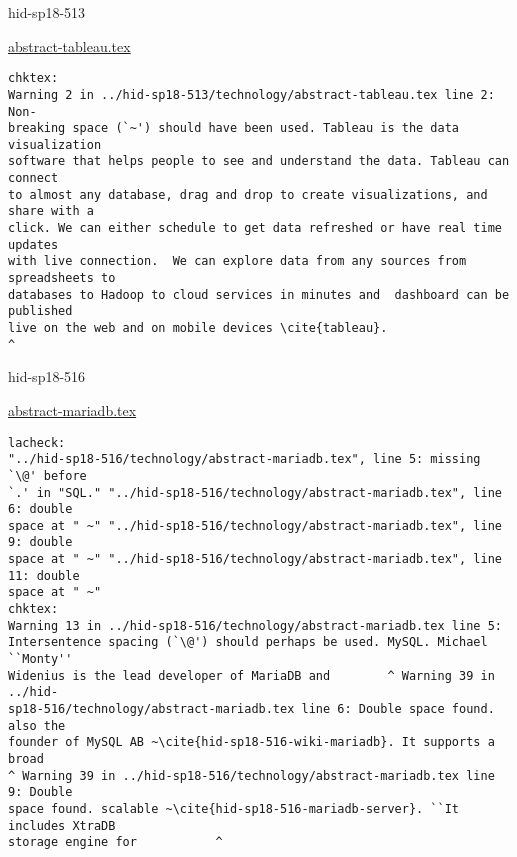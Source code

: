\begin{IU}

hid-sp18-513

\href{https://github.com/cloudmesh-community/hid-sp18-513/blob/master//technology/abstract-tableau.tex}{abstract-tableau.tex}

\begin{tiny}
\begin{verbatim}
chktex:
Warning 2 in ../hid-sp18-513/technology/abstract-tableau.tex line 2: Non-
breaking space (`~') should have been used. Tableau is the data visualization
software that helps people to see and understand the data. Tableau can connect
to almost any database, drag and drop to create visualizations, and share with a
click. We can either schedule to get data refreshed or have real time updates
with live connection.  We can explore data from any sources from spreadsheets to
databases to Hadoop to cloud services in minutes and  dashboard can be published
live on the web and on mobile devices \cite{tableau}.
^
\end{verbatim}
\end{tiny}
\end{IU}



\begin{IU}

hid-sp18-516

\href{https://github.com/cloudmesh-community/hid-sp18-516/blob/master//technology/abstract-mariadb.tex}{abstract-mariadb.tex}

\begin{tiny}
\begin{verbatim}
lacheck:
"../hid-sp18-516/technology/abstract-mariadb.tex", line 5: missing `\@' before
`.' in "SQL." "../hid-sp18-516/technology/abstract-mariadb.tex", line 6: double
space at " ~" "../hid-sp18-516/technology/abstract-mariadb.tex", line 9: double
space at " ~" "../hid-sp18-516/technology/abstract-mariadb.tex", line 11: double
space at " ~"
chktex:
Warning 13 in ../hid-sp18-516/technology/abstract-mariadb.tex line 5:
Intersentence spacing (`\@') should perhaps be used. MySQL. Michael ``Monty''
Widenius is the lead developer of MariaDB and        ^ Warning 39 in ../hid-
sp18-516/technology/abstract-mariadb.tex line 6: Double space found. also the
founder of MySQL AB ~\cite{hid-sp18-516-wiki-mariadb}. It supports a broad
^ Warning 39 in ../hid-sp18-516/technology/abstract-mariadb.tex line 9: Double
space found. scalable ~\cite{hid-sp18-516-mariadb-server}. ``It includes XtraDB
storage engine for           ^
\end{verbatim}
\end{tiny}
\end{IU}

